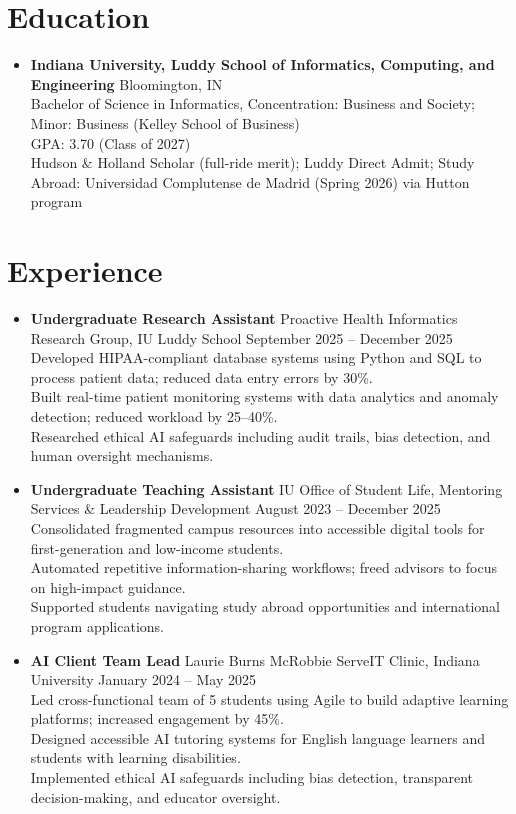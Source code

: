\documentclass[11pt]{article}
\begin{document}
\section*{Education}
\begin{itemize}[leftmargin=*]
    \item \textbf{Indiana University, Luddy School of Informatics, Computing, and Engineering} Bloomington, IN\\
    Bachelor of Science in Informatics, Concentration: Business and Society; Minor: Business (Kelley School of Business)\\
    GPA: 3.70 (Class of 2027)\\
    Hudson \& Holland Scholar (full-ride merit); Luddy Direct Admit; Study Abroad: Universidad Complutense de Madrid (Spring 2026) via Hutton program
 \end{itemize}

\section*{Experience}
\begin{itemize}[leftmargin=*]
    \item \textbf{Undergraduate Research Assistant} Proactive Health Informatics Research Group, IU Luddy School \hfill September 2025 -- December 2025\\
    Developed HIPAA-compliant database systems using Python and SQL to process patient data; reduced data entry errors by 30\%.\\
    Built real-time patient monitoring systems with data analytics and anomaly detection; reduced workload by 25--40\%.\\
    Researched ethical AI safeguards including audit trails, bias detection, and human oversight mechanisms.

    \item \textbf{Undergraduate Teaching Assistant} IU Office of Student Life, Mentoring Services \& Leadership Development \hfill August 2023 -- December 2025\\
    Consolidated fragmented campus resources into accessible digital tools for first-generation and low-income students.\\
    Automated repetitive information-sharing workflows; freed advisors to focus on high-impact guidance.\\
    Supported students navigating study abroad opportunities and international program applications.

    \item \textbf{AI Client Team Lead} Laurie Burns McRobbie ServeIT Clinic, Indiana University \hfill January 2024 -- May 2025\\
    Led cross-functional team of 5 students using Agile to build adaptive learning platforms; increased engagement by 45\%.\\
    Designed accessible AI tutoring systems for English language learners and students with learning disabilities.\\
    Implemented ethical AI safeguards including bias detection, transparent decision-making, and educator oversight.
\end{itemize}
\end{document}

